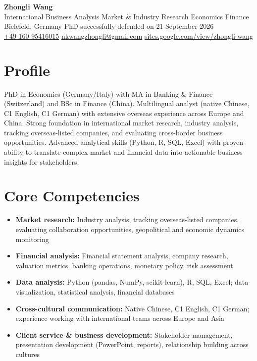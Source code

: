 \documentclass[a4paper,11pt]{article}
\begin{document}
\begin{center}
  {\LARGE\textbf{\textcolor{accent}{Zhongli Wang}}}\\[3pt]
  {\large International Business Analysis \textbar{} Market \& Industry Research \textbar{} Economics \textbar{} Finance}\\[3pt]
  Bielefeld, Germany \textbar{} PhD successfully defended on 21 September 2026\\[2pt]
  \href{tel:+4916095416015}{+49 160 95416015} \textbar{}
  \href{mailto:nkwangzhongli@gmail.com}{nkwangzhongli@gmail.com} \textbar{}
  \href{https://sites.google.com/view/zhongli-wang/}{sites.google.com/view/zhongli-wang}
\end{center}

\section{Profile}
PhD in Economics (Germany/Italy) with MA in Banking \& Finance (Switzerland) and BSc in Finance (China). 
Multilingual analyst (native Chinese, C1 English, C1 German) with extensive overseas experience across Europe and China. 
Strong foundation in international market research, industry analysis, tracking overseas-listed companies, and evaluating cross-border business opportunities. 
Advanced analytical skills (Python, R, SQL, Excel) with proven ability to translate complex market and financial data into actionable business insights for stakeholders.

\section{Core Competencies}
\begin{itemize}
  \item \textbf{Market research:} Industry analysis, tracking overseas-listed companies, evaluating collaboration opportunities, geopolitical and economic dynamics monitoring
  \item \textbf{Financial analysis:} Financial statement analysis, company research, valuation metrics, banking operations, monetary policy, risk assessment
  \item \textbf{Data analysis:} Python (pandas, NumPy, scikit-learn), R, SQL, Excel; data visualization, statistical analysis, financial databases
  \item \textbf{Cross-cultural communication:} Native Chinese, C1 English, C1 German; experience working with international teams across Europe and Asia
  \item \textbf{Client service \& business development:} Stakeholder management, presentation development (PowerPoint, reports), relationship building across cultures
\end{itemize}
\end{document}
